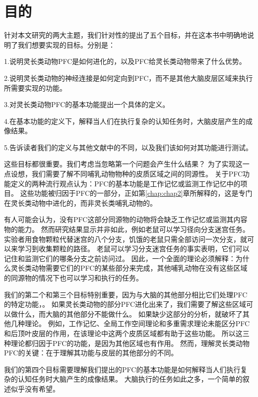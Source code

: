 \section{目的}
针对本文研究的两大主题，我们针对性的提出了五个目标，并在这本书中明确地说明了我们想要实现的目标。分别是：
\par 
  1.说明灵长类动物PFC是如何进化的，以及PFC给灵长类动物带来了什么优势。 
\par 2.说明灵长类动物的神经连接是如何定向到PFC，而不是其他大脑皮层区域来执行所需要实现的功能。 
\par 3.对灵长类动物PFC的基本功能提出一个具体的定义。
\par 4.在基本功能的定义下，解释当人们在执行复杂的认知任务时，大脑皮层产生的成像结果。
\par  5.告诉读者我们的定义与其他文献中的不同，以及我们该如何对其功能进行测试。
\par 
这些目标都很重要。我们考虑当忽略第一个问题会产生什么结果？
为了实现这一点设想，我们需要了解不同哺乳动物物种的皮质区域之间的同源性。
关于PFC功能定义的两种流行观点认为：PFC的基本功能是工作记忆\cite{goldman1996prefrontal}或监测工作记忆中的项目\cite{petrides1996specialized}。
这些功能被归因于PFC的一部分，正如第\ref{chap:chap2}章所解释的，这是专门在灵长类动物中进化的，而非灵长类哺乳动物的。
\par 
有人可能会认为，没有PFC这部分同源物的动物将会缺乏工作记忆或监测其内容物的能力。
然而研究结果显示并非如此，例如老鼠可以学习径向分支迷宫任务。
实验者用食物颗粒代替迷宫的八个分支，饥饿的老鼠只需全部访问一次分支，就可以来学习到收集颗粒的路径\cite{olton1982disconnection}。
老鼠可以学习分支迷宫任务的事实表明，它们可以记住和监测它们的哪条分支之前访问过。
因此，一个全面的理论必须解释：为什么灵长类动物需要它们的PFC的某些部分来完成，其他哺乳动物在没有这些区域的同源物的情况下也可以学习和执行的任务。
\par
我们的第二个和第三个目标特别重要，因为与大脑的其他部分相比它们处理PFC的特定功能，。
如果灵长类动物的部分PFC进化出来了，我们需要了解这些区域可以做什么，而大脑的其他部分不能做什么。
如果缺少这部分的分析，就破坏了其他几种理论。
例如，工作记忆\cite{baddeley1998domain}、全局工作空间理论\cite{dehaene1998neuronal}和多重需求理论未能区分PFC和后顶叶皮层的作用，在该理论中这两个皮质区域都有助于这些功能。
所以这三种理论都归因于PFC的功能，是因为其他区域也有作用。
然而，理解灵长类动物PFC的关键：在于理解其功能与皮层的其他部分的不同。
\par
我们的第四个目标需要理解我们提出的PFC的基本功能是如何解释当人们执行复杂的认知任务时大脑产生的成像结果。
大脑执行的任务如此之多，一个简单的叙述似乎没有希望。
